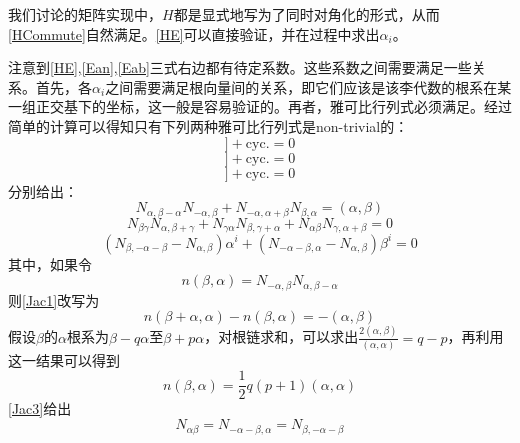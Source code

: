 \documentclass{ctexart}
\begin{document}
	我们讨论的矩阵实现中，$H$都是显式地写为了同时对角化的形式，从而\eqref{HCommute}自然满足。\eqref{HE}可以直接验证，并在过程中求出$\alpha_i$。
	
	注意到\eqref{HE},\eqref{Ean},\eqref{Eab}三式右边都有待定系数。这些系数之间需要满足一些关系。首先，各$\alpha_i$之间需要满足根向量间的关系，即它们应该是该李代数的根系在某一组正交基下的坐标，这一般是容易验证的。再者，雅可比行列式必须满足。经过简单的计算可以得知只有下列两种雅可比行列式是non-trivial的：
	\begin{equation}
	[E_\beta,[E_\alpha,E_{-\alpha}]]+\text{cyc.}=0
	\end{equation}
	\begin{equation}
	[E_\alpha,[E_\beta,E_\gamma]]+\text{cyc.}=0
	\end{equation}
	\begin{equation}
	[E_\alpha,[E_\beta,E_{-\alpha-\beta}]]+\text{cyc.}=0
	\end{equation}
	分别给出：
	\begin{equation}\label{Jac1}
	N_{\alpha,\beta-\alpha}N_{-\alpha,\beta}+N_{-\alpha,\alpha+\beta}N_{\beta,\alpha}=(\alpha,\beta)
	\end{equation}
	\begin{equation}\label{Jac2}
	N_{\beta\gamma}N_{\alpha,\beta+\gamma}+N_{\gamma\alpha}N_{\beta,\gamma+\alpha}+N_{\alpha\beta}N_{\gamma,\alpha+\beta}=0
	\end{equation}
	\begin{equation}\label{Jac3}
	(N_{\beta,-\alpha-\beta}-N_{\alpha,\beta})\alpha^i+(N_{-\alpha-\beta,\alpha}-N_{\alpha,\beta})\beta^i=0
	\end{equation}
	其中，如果令
	\begin{equation}
	n(\beta,\alpha)=N_{-\alpha,\beta}N_{\alpha,\beta-\alpha}
	\end{equation}
	则\eqref{Jac1}改写为
	\begin{equation}
	n(\beta+\alpha,\alpha)-n(\beta,\alpha)=-(\alpha,\beta)
	\end{equation}
	假设$\beta$的$\alpha$根系为$\beta-q\alpha$至$\beta+p\alpha$，对根链求和，可以求出$\frac{2(\alpha,\beta)}{(\alpha,\alpha)}=q-p$，再利用这一结果可以得到
	\begin{equation}
	n(\beta,\alpha)=\frac{1}{2}q(p+1)(\alpha,\alpha)
	\end{equation}
	\eqref{Jac3}给出
	\begin{equation}
	N_{\alpha\beta}=N_{-\alpha-\beta,\alpha}=N_{\beta,-\alpha-\beta}
	\end{equation}
	
\end{document}
